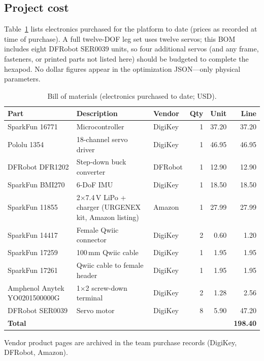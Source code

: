 \documentclass[11pt]{article}
\begin{document}
\subsection{Project cost}
Table~\ref{tab:cost} lists electronics purchased for the platform to date (prices as recorded at time of purchase). A full twelve-DOF leg set uses twelve servos; this BOM includes eight DFRobot SER0039 units, so four additional servos (and any frame, fasteners, or printed parts not listed here) should be budgeted to complete the hexapod. No dollar figures appear in the optimization JSON---only physical parameters.

\begin{table}[htbp]
  \centering
  \caption{Bill of materials (electronics purchased to date; USD).}
  \label{tab:cost}
  \footnotesize
  \setlength{\tabcolsep}{4pt}
  \begin{tabular}{@{}p{2.35cm}p{4.35cm}p{1.15cm}rrr@{}}
    \toprule
    Part & Description & Vendor & Qty & Unit & Line \\
    \midrule
    SparkFun 16771 & Microcontroller & DigiKey & 1 & 37.20 & 37.20 \\
    Pololu 1354 & 18-channel servo driver & DigiKey & 1 & 46.95 & 46.95 \\
    DFRobot DFR1202 & Step-down buck converter & DFRobot & 1 & 12.90 & 12.90 \\
    SparkFun BMI270 & 6-DoF IMU & DigiKey & 1 & 18.50 & 18.50 \\
    SparkFun 11855 & 2$\times$7.4\,V LiPo + charger (URGENEX kit, Amazon listing) & Amazon & 1 & 27.99 & 27.99 \\
    SparkFun 14417 & Female Qwiic connector & DigiKey & 2 & 0.60 & 1.20 \\
    SparkFun 17259 & 100\,mm Qwiic cable & DigiKey & 1 & 1.95 & 1.95 \\
    SparkFun 17261 & Qwiic cable to female header & DigiKey & 1 & 1.95 & 1.95 \\
    Amphenol Anytek YO0201500000G & 1$\times$2 screw-down terminal & DigiKey & 2 & 1.28 & 2.56 \\
    DFRobot SER0039 & Servo motor & DigiKey & 8 & 5.90 & 47.20 \\
    \midrule
    \textbf{Total} & & & & & \textbf{198.40} \\
    \bottomrule
  \end{tabular}
\end{table}
\normalsize
Vendor product pages are archived in the team purchase records (DigiKey, DFRobot, Amazon).
\end{document}
